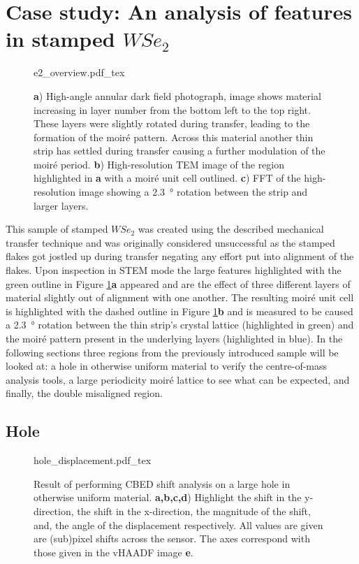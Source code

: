 \section{Case study: An analysis of features in stamped $WSe_2$}
\begin{figure}
    \centering
    \def\svgwidth{.95\linewidth}
    {e2_overview.pdf_tex}
    \caption{\textbf{a}) High-angle annular dark field photograph, image shows material increasing in layer number from the bottom left to the top right. These layers were slightly rotated during transfer, leading to the formation of the moiré pattern. Across this material another thin strip has settled during transfer causing a further modulation of the moiré period. \textbf{b}) High-resolution TEM image of the region highlighted in \textbf{a} with a moiré unit cell outlined. \textbf{c}) FFT of the high-resolution image showing a \SI{2.3}{\degree} rotation between the strip and larger layers.}
    \label{fig:dub_moire}
\end{figure}

This sample of stamped $WSe_2$ was created using the described mechanical transfer technique and was originally considered unsuccessful as the stamped flakes got jostled up during transfer negating any effort put into alignment of the flakes. Upon inspection in STEM mode the large features highlighted with the green outline in Figure \ref{fig:dub_moire}\textbf{a} appeared and are the effect of three different layers of material slightly out of alignment with one another. The resulting moiré unit cell is highlighted with the dashed outline in Figure \ref{fig:dub_moire}\textbf{b} and is measured to be caused a \SI{2.3}{\degree} rotation between the thin strip's crystal lattice (highlighted in green) and the moiré pattern present in the underlying layers (highlighted in blue).
In the following sections three regions from the previously introduced sample will be looked at: a hole in otherwise uniform material to verify the centre-of-mass analysis tools, a large periodicity moiré lattice to see what can be expected, and finally, the double misaligned region.

\subsection{Hole}

\begin{figure}
    \centering
    \def\svgwidth{.95\linewidth}
    {hole_displacement.pdf_tex}
    \caption{Result of performing CBED shift analysis on a large hole in otherwise uniform material. \textbf{a,b,c,d}) Highlight the shift in the y-direction, the shift in the x-direction, the magnitude of the shift, and, the angle of the displacement respectively. All values are given are (sub)pixel shifts across the sensor. The axes correspond with those given in the vHAADF image \textbf{e}.}
    \label{fig:hole_dis}
\end{figure}



